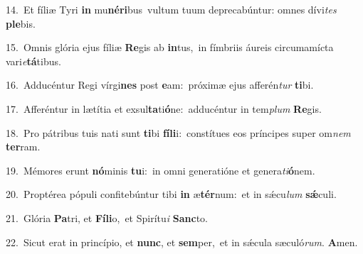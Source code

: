 {\numbfont\textcolor{\numbcolor}{14.}}~Et fíliæ Tyri \textbf{in} mu\-\textbf{né}\-\textbf{ri}bus~\star vultum tuum deprecabúntur: omnes dívi\textit{tes} \textbf{ple}\-bis.\par
{\numbfont\textcolor{\numbcolor}{15.}}~Omnis glória ejus fíliæ \textbf{Re}\-gis ab \textbf{in}\-tus,~\star in fímbriis áureis circumamícta vari\-\textit{e}\-\textbf{tá}tibus.\par
{\numbfont\textcolor{\numbcolor}{16.}}~Adducéntur Regi vírgi\textbf{nes} post \textbf{e}\-am:~\star próximæ ejus afferén\textit{tur} \textbf{ti}\-bi.\par
{\numbfont\textcolor{\numbcolor}{17.}}~Afferéntur in lætítia et exsul\-\textbf{ta}\-ti\-\textbf{ó}\-ne:~\star adducéntur in tem\textit{plum} \textbf{Re}\-gis.\par
{\numbfont\textcolor{\numbcolor}{18.}}~Pro pátribus tuis nati sunt \textbf{ti}\-bi \textbf{fí}\-\textbf{li}i:~\star constítues eos príncipes super om\textit{nem} \textbf{ter}\-ram.\par
{\numbfont\textcolor{\numbcolor}{19.}}~Mémores erunt \textbf{nó}\-minis \textbf{tu}\-i:~\star in omni generatióne et genera\-\textit{ti}\-\textbf{ó}nem.\par
{\numbfont\textcolor{\numbcolor}{20.}}~Proptérea pópuli confitebúntur tibi \textbf{in} æ\-\textbf{tér}\-num:~\star et in sǽcu\textit{lum} \textbf{sǽ}\-culi.\par
{\numbfont\textcolor{\numbcolor}{21.}}~Glória \textbf{Pa}\-tri, et \textbf{Fí}\-\textbf{li}o,~\star et Spirítu\textit{i} \textbf{Sanc}\-to.\par
{\numbfont\textcolor{\numbcolor}{22.}}~Sicut erat in princípio, et \textbf{nunc}\-, et \textbf{sem}\-per,~\star et in sǽcula sæculó\-\textit{rum}\-. \textbf{A}\-men.\par
